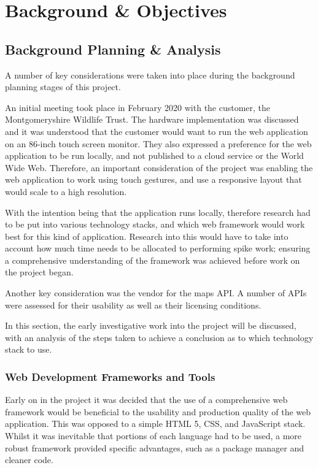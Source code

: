 \chapter{Background \& Objectives}

\section{Background Planning \& Analysis}

A number of key considerations were taken into place during the background planning stages of this project.

An initial meeting took place in February 2020 with the customer, the Montgomeryshire Wildlife Trust. The hardware implementation was discussed and it was understood that the customer would want to run the web application on an 86-inch touch screen monitor. They also expressed a preference for the web application to be run locally, and not published to a cloud service or the World Wide Web. Therefore, an important consideration of the project was enabling the web application to work using touch gestures, and use a responsive layout that would scale to a high resolution.

With the intention being that the application runs locally, therefore research had to be put into various technology stacks, and which web framework would work best for this kind of application. Research into this would have to take into account how much time needs to be allocated to performing spike work; ensuring a comprehensive understanding of the framework was achieved before work on the project began.

Another key consideration was the vendor for the maps API. A number of APIs were assessed for their usability as well as their licensing conditions.

In this section, the early investigative work into the project will be discussed, with an analysis of the steps taken to achieve a conclusion as to which technology stack to use. 

\subsection{Web Development Frameworks and Tools}

Early on in the project it was decided that the use of a comprehensive web framework would be beneficial to the usability and production quality of the web application. This was opposed to a simple HTML 5, CSS, and JavaScript stack. Whilst it was inevitable that portions of each language had to be used, a more robust framework provided specific advantages, such as a package manager and cleaner code.


